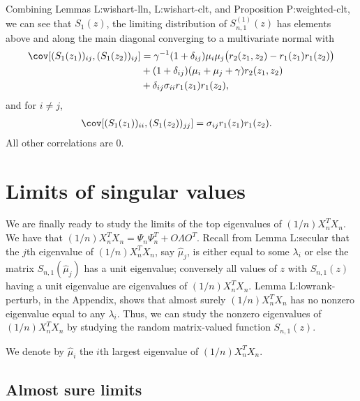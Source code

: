 Combining Lemmas {L:wishart-lln}, {L:wishart-clt}, and Proposition {P:weighted-clt}, we can see that $S_1(z)$, the limiting distribution of
$S_{n,1}^{(1)}(z)$ has elements above and along the main diagonal converging
to a multivariate normal with
\begin{align}
    \cov[ (S_1(z_1))_{ij}, (S_1(z_2))_{ij} ]
    &= \gamma^{-1} (1 + \delta_{ij}) \mu_i \mu_j 
                 \big( r_2 (z_1, z_2) - r_1(z_1) r_1 (z_2) \big) \notag \\
      &+ (1 + \delta_{ij}) (\mu_i + \mu_j + \gamma) r_2(z_1, z_2) \notag \\
      &+ \delta_{ij} \sigma_{ii} r_1(z_1) r_1(z_2), \label{E:cov-S1-1}
\end{align}
and for $i \neq j$,
\begin{align}
    \cov[ (S_1(z_1))_{ii}, (S_1(z_2))_{jj} ]
    &= \sigma_{ij} r_1(z_1) r_1(z_2). \label{E:cov-S1-2}
\end{align}
All other correlations are $0$.

\section{Limits of singular values}

We are finally ready to study the limits of the top eigenvalues of
$(1/n) X_n^T X_n$.  We have that
$(1/n) X_n^T X_n = \Psi_n \Psi_n^T + O \Lambda O^T$. Recall from
Lemma {L:secular} that the $j$th eigenvalue of $(1/n) X_n^T X_n$, say 
$\hat \mu_j$, is either equal to some $\lambda_i$ or else the matrix
$S_{n,1}(\hat \mu_j)$ has a unit eigenvalue; conversely all values of $z$ with
$S_{n,1}(z)$ having a unit eigenvalue are eigenvalues of $(1/n) X_n^T X_n$.
Lemma {L:lowrank-perturb}, in the Appendix, shows that  almost surely
$(1/n) X_n^T X_n$ has no nonzero eigenvalue equal to any $\lambda_i$.  Thus,
we can study the nonzero eigenvalues of $(1/n) X_n^T X_n$ by studying the
random matrix-valued function $S_{n,1}(z)$.

We denote by $\hat \mu_i$ the $i$th largest eigenvalue of $(1/n) X_n^T X_n$.

\subsection{Almost sure limits}\label{SS:value-limit}

